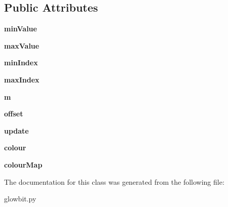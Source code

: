 \subsection*{Public Attributes}
\begin{DoxyCompactItemize}
\item 
\mbox{\label{classglowbit_1_1stick_1_1graph1D_a1a0b5e32db369f6b6253a2010abd9927}} 
{\bfseries min\+Value}
\item 
\mbox{\label{classglowbit_1_1stick_1_1graph1D_a3048e88f86ca331e54635ec2e6c60e5d}} 
{\bfseries max\+Value}
\item 
\mbox{\label{classglowbit_1_1stick_1_1graph1D_ad1e026360113687c6a2b6bec9f5b0cdc}} 
{\bfseries min\+Index}
\item 
\mbox{\label{classglowbit_1_1stick_1_1graph1D_a76946ca7d21c9323bc75a7cb254178ff}} 
{\bfseries max\+Index}
\item 
\mbox{\label{classglowbit_1_1stick_1_1graph1D_aa9e608ce7572fcd338d06431296c65ca}} 
{\bfseries m}
\item 
\mbox{\label{classglowbit_1_1stick_1_1graph1D_a5881c702849e31be5db908e316a18310}} 
{\bfseries offset}
\item 
\mbox{\label{classglowbit_1_1stick_1_1graph1D_aafaf7afb2c66c6b9c4edec4fc34c3722}} 
{\bfseries update}
\item 
\mbox{\label{classglowbit_1_1stick_1_1graph1D_aaad26d7930ec770e094d525c2cab12b8}} 
{\bfseries colour}
\item 
\mbox{\label{classglowbit_1_1stick_1_1graph1D_a52b7b7cc9d5385620272068f2255ddbd}} 
{\bfseries colour\+Map}
\end{DoxyCompactItemize}


The documentation for this class was generated from the following file\+:\begin{DoxyCompactItemize}
\item 
glowbit.\+py\end{DoxyCompactItemize}
